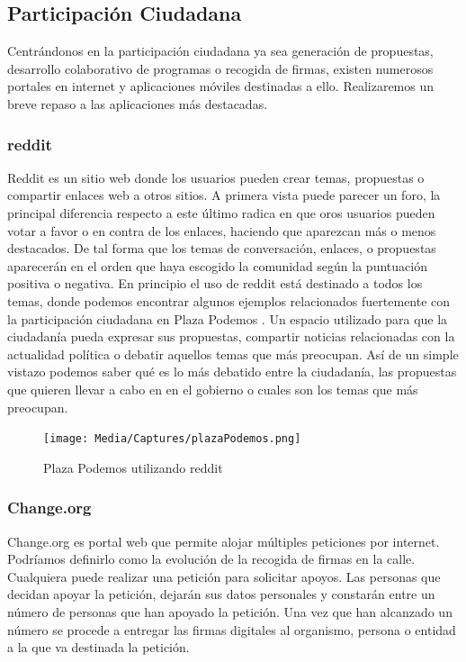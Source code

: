 \subsection{Participación Ciudadana}

Centrándonos en la participación ciudadana ya sea generación de propuestas, desarrollo colaborativo de programas o recogida de firmas, existen numerosos portales en internet y aplicaciones móviles destinadas a ello. Realizaremos un breve repaso a las aplicaciones más destacadas.

\subsubsection{reddit}

Reddit \cite{ref:reddit} es un sitio web donde los usuarios pueden crear temas, propuestas o compartir enlaces web a otros sitios. A primera vista puede parecer un foro, la principal diferencia respecto a este último radica en que oros usuarios pueden votar a favor o en contra de los enlaces, haciendo que aparezcan más o menos destacados. De tal forma que los temas de conversación, enlaces, o propuestas aparecerán en el orden que haya escogido la comunidad según la puntuación positiva o negativa.
En principio el uso de reddit está destinado a todos los temas, donde podemos encontrar algunos ejemplos relacionados fuertemente con la participación ciudadana en Plaza Podemos \cite{ref:plazaPodemos}. Un espacio utilizado para que la ciudadanía pueda expresar sus propuestas, compartir noticias relacionadas con la actualidad política o debatir aquellos temas que más preocupan. Así de un simple vistazo podemos saber qué es lo más debatido entre la ciudadanía, las propuestas que quieren llevar a cabo en en el gobierno o cuales son los temas que más preocupan.

\begin{figure}[H]
\centering
\texttt{[image: Media/Captures/plazaPodemos.png]}
\caption{Plaza Podemos utilizando reddit}
\label{fig:plazaPodemos}
\end{figure}

\subsubsection{Change.org}

Change.org \cite{ref:changeOrg} es portal web que permite alojar múltiples peticiones por internet. Podríamos definirlo como la evolución de la recogida de firmas en la calle. Cualquiera puede realizar una petición para solicitar apoyos. Las personas que decidan apoyar la petición, dejarán sus datos personales y constarán entre un número de personas que han apoyado la petición. Una vez que han alcanzado un número se procede a entregar las firmas digitales al organismo, persona o entidad a la que va destinada la petición.

